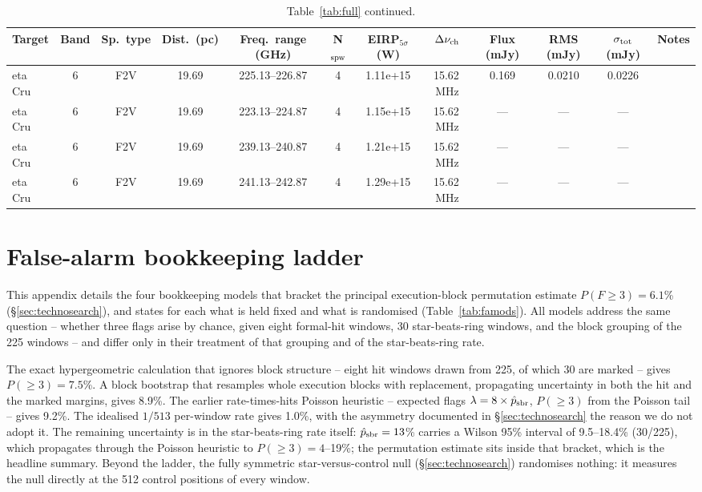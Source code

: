 \documentclass{openjournal}
\begin{document}
\begin{table}
\centering
\scriptsize
\setlength{\tabcolsep}{2pt}
\caption{Table~\ref{tab:full} continued.}
\label{tab:full8}
\begin{tabularx}{\textwidth}{@{}l c c c c c c c c c c X@{}}
\hline
Target & Band & Sp.\ type & Dist.\ (pc) & Freq.\ range (GHz) & N$_{\rm spw}$ & EIRP$_{5\sigma}$ (W) & $\Delta\nu_{\rm ch}$ & Flux (mJy) & RMS (mJy) & $\sigma_{\rm tot}$ (mJy) & Notes \\
\hline
 eta Cru & 6 & F2V & 19.69 & 225.13--226.87 & 4 & 1.11e+15 & 15.62\,MHz & 0.169 & 0.0210 & 0.0226 &  \\
 eta Cru & 6 & F2V & 19.69 & 223.13--224.87 & 4 & 1.15e+15 & 15.62\,MHz & --- & --- & --- &  \\
 eta Cru & 6 & F2V & 19.69 & 239.13--240.87 & 4 & 1.21e+15 & 15.62\,MHz & --- & --- & --- &  \\
 eta Cru & 6 & F2V & 19.69 & 241.13--242.87 & 4 & 1.29e+15 & 15.62\,MHz & --- & --- & --- &  \\
\hline
\end{tabularx}
\end{table}

\section{False-alarm bookkeeping ladder}
\label{app:falsealarm}

This appendix details the four bookkeeping models that bracket the
principal execution-block permutation estimate
$P(F{\geq}3)=6.1$\% (\S\ref{sec:technosearch}), and states for each
what is held fixed and what is randomised
(Table~\ref{tab:famods}). All models address the same question --
whether three flags arise by chance, given eight formal-hit windows,
30 star-beats-ring windows, and the block grouping of the 225 windows
-- and differ only in their treatment of that grouping and of the
star-beats-ring rate.

The exact hypergeometric calculation that ignores block structure --
eight hit windows drawn from 225, of which 30 are marked -- gives
$P(\geq3)=7.5$\%. A block bootstrap that resamples whole execution
blocks with replacement, propagating uncertainty in both the hit and
the marked margins, gives 8.9\%. The earlier rate-times-hits Poisson
heuristic -- expected flags $\lambda = 8\times\hat{p}_{\rm sbr}$,
$P(\geq3)$ from the Poisson tail -- gives 9.2\%. The idealised
$1/513$ per-window rate gives 1.0\%, with the asymmetry documented in
\S\ref{sec:technosearch} the reason we do not adopt it. The remaining
uncertainty is in the star-beats-ring rate itself:
$\hat{p}_{\rm sbr}=13$\% carries a Wilson 95\% interval of
9.5--18.4\% (30/225), which propagates through the Poisson heuristic
to $P(\geq3)=4$--19\%; the permutation estimate sits inside that
bracket, which is the headline summary. Beyond the ladder, the fully
symmetric star-versus-control null (\S\ref{sec:technosearch})
randomises nothing: it measures the null directly at the 512 control
positions of every window.
\end{document}
